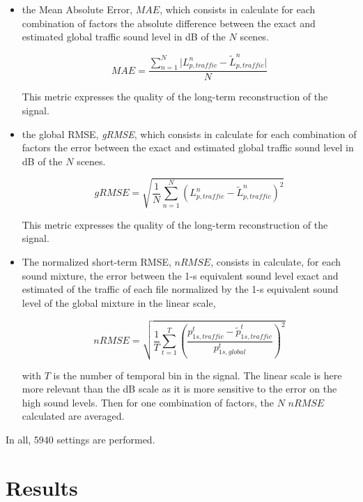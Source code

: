\documentclass[twocolumn,a4paper,10pt]{article}
\begin{document}
\begin{itemize}

\item the Mean Absolute Error, $MAE$, which consists in calculate for each combination of factors the absolute difference between the exact and estimated global traffic sound level in dB of the $N$ scenes.

\begin{equation}
MAE = \frac{\sum_{n = 1}^N\vert L^n_{p,traffic}-\tilde{L}^n_{p,traffic} \vert}{N}
\end{equation}

This metric expresses the quality of the long-term reconstruction of the signal. 

\item the global RMSE, \textit{gRMSE}, which consists in calculate for each combination of factors the error between the exact and estimated global traffic sound level in dB of the $N$ scenes.

\begin{equation}
gRMSE = \sqrt{\frac{1}{N}\sum_{n = 1}^N \left(L^n_{p,traffic}-\tilde{L}^n_{p,traffic}\right)^2}
\end{equation}

This metric expresses the quality of the long-term reconstruction of the signal. 
\item The normalized short-term RMSE, $nRMSE$, consists in calculate, for each sound mixture, the error between the 1-s equivalent sound level exact and estimated of the traffic of each file normalized by the 1-s equivalent sound level of the global mixture in the linear scale, 

\begin{equation}
nRMSE = \sqrt{\frac{1}{T}\sum_{t = 1}^T \left(\frac{p^t_{1s,traffic}-\tilde{p}^t_{1s,traffic}}{p^t_{1s,global}}\right)^2}
\end{equation}

with $T$ is the number of temporal bin in the signal. The linear scale is here more relevant than the dB scale as it is more sensitive to the error on the high sound levels. Then for one combination of factors, the $N$ $nRMSE$ calculated are averaged.\\
\end{itemize}

In all, 5940 settings are performed.

\section{Results}\label{part:results}
\end{document}
